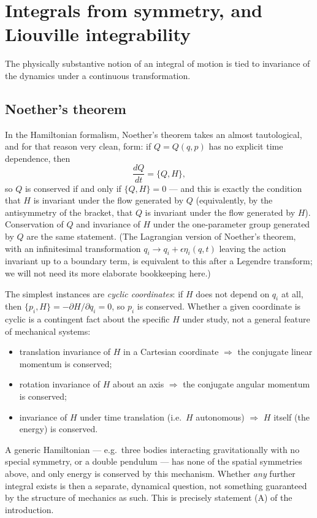\documentclass[11pt]{article}
\theoremstyle{definition}
\theoremstyle{remark}
\newcommand{\PB}[2]{\{#1,#2\}}
\begin{document}
\section{Integrals from symmetry, and Liouville integrability}\label{sec:symmetry}

The physically substantive notion of an integral of motion is tied to
invariance of the dynamics under a continuous transformation.

\subsection{Noether's theorem}

In the Hamiltonian formalism, Noether's theorem takes an almost
tautological, and for that reason very clean, form: if $Q=Q(q,p)$ has no
explicit time dependence, then
\begin{equation}
\frac{dQ}{dt}=\PB{Q}{H},
\end{equation}
so $Q$ is conserved if and only if $\PB{Q}{H}=0$ --- and this is exactly
the condition that $H$ is invariant under the flow generated by $Q$ (equivalently,
by the antisymmetry of the bracket, that $Q$ is invariant under the flow
generated by $H$). Conservation of $Q$ and invariance of $H$ under the
one-parameter group generated by $Q$ are the same statement. (The
Lagrangian version of Noether's theorem, with an infinitesimal
transformation $q_i\to q_i+\epsilon\eta_i(q,t)$ leaving the action
invariant up to a boundary term, is equivalent to this after a Legendre
transform; we will not need its more elaborate bookkeeping here.)

The simplest instances are \emph{cyclic coordinates}: if $H$ does not
depend on $q_i$ at all, then $\PB{p_i}{H}=-\partial H/\partial q_i=0$, so
$p_i$ is conserved. Whether a given coordinate is cyclic is a contingent
fact about the specific $H$ under study, not a general feature of
mechanical systems:
\begin{itemize}
\item translation invariance of $H$ in a Cartesian coordinate $\Rightarrow$
the conjugate linear momentum is conserved;
\item rotation invariance of $H$ about an axis $\Rightarrow$ the conjugate
angular momentum is conserved;
\item invariance of $H$ under time translation (i.e.\ $H$ autonomous)
$\Rightarrow$ $H$ itself (the energy) is conserved.
\end{itemize}
A generic Hamiltonian --- e.g.\ three bodies interacting gravitationally
with no special symmetry, or a double pendulum --- has none of the spatial
symmetries above, and only energy is conserved by this mechanism. Whether
\emph{any} further integral exists is then a separate, dynamical question,
not something guaranteed by the structure of mechanics as such. This is
precisely statement (A) of the introduction.
\end{document}
